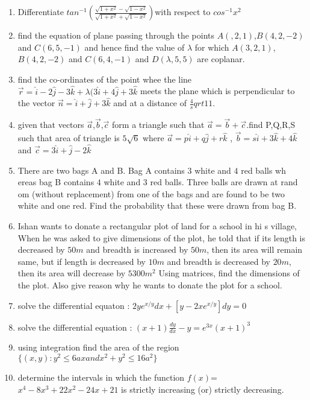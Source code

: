 \documentclass[12pt,-letter paper]{article}
\begin{document}
\begin{enumerate}
\item Differentiate $tan^{-1}{(\frac{\sqrt{1+x^2}-\sqrt{1-x    ^2}}{\sqrt{1+x^2}+\sqrt{1-x^2}}) }$with respect to $cos^{-1    }{x^2}$
\item find the equation of plane passing through the points $A(,2,1)$,$B(4,2,-2)$ and $C(6,5,-1)$ and hence find the value of $\lambda $ for which $ A(3,2,1)$,$B(4,2,-2)$ and $C(6,4,-1)$ and $D(\lambda,5,5)$ are coplanar.
\item find the co-ordinates of the point whee the line $\overrightarrow{r}=\hat{i}-2\hat{j}-3\hat{k}+\lambda(3\hat{i}+4\hat{j}+3\hat{k}$ meets the plane which is perpendicular to the vector $\overrightarrow{n}=\hat{i}+\hat{j}+3\hat{k}$ and at a distance of $\frac{4}sqrt{11}$.
\item given that vectors $\overrightarrow{a}$,$\overrightarrow{b}$,$\overrightarrow{c}$ form a triangle such that $\overrightarrow{a}=\overrightarrow{b}+\overrightarrow{c}$.find P,Q,R,S such that area  of triangle is $5\sqrt{6}$ where $\overrightarrow{a}=p\hat{i}+q\hat{j}+r\hat{k}$ , $\overrightarrow{b}=s\hat{i}+3\hat{k}+4\hat{k}$ and $\overrightarrow{c}=3\hat{i}+\hat{j}-2\hat{k}$ 
\item There are two bags A and B. Bag A contains $3$ white and $4$ red balls wh    ereas bag B contains $4$ white and $3$ red balls. Three balls are drawn at rand    om (without replacement) from one of the bags and are found to be two white and     one red. Find the probability that these were drawn from bag B.
\item Ishan wants to donate a rectangular plot of land for a school in hi    s village, When he was asked to give dimensions of the plot, he told that     if its length is decreased by $50 m$ and breadth is increased by $50 m$,     then its area will remain same, but if length is decreased by $10 m$ and     breadth is decreased by   $20 m$, then its area will decrease by $5300 m     ^ 2 $  Using matrices, find the dimensions of the plot. Also give reason     why he wants to donate the plot for a school.
\item solve the differential equaton : $2ye^{x/y}dx+[y-2xe^{x/y}]dy=0$
\item solve the differential equation : $(x+1)\frac{dy}{dx}-y=e^{3x}(x+1)^3$
\item using integration find the area of the region $\{(x,y):y^2 \leq 6 ax and x^2+y^2 \leq 16a^2\}$	
\item determine the intervals in which the function $f(x)$=$x^4-8x^3+22x^2-24x+21$ is strictly increasing (or) strictly decreasing.

\end{enumerate}
\end{document}
